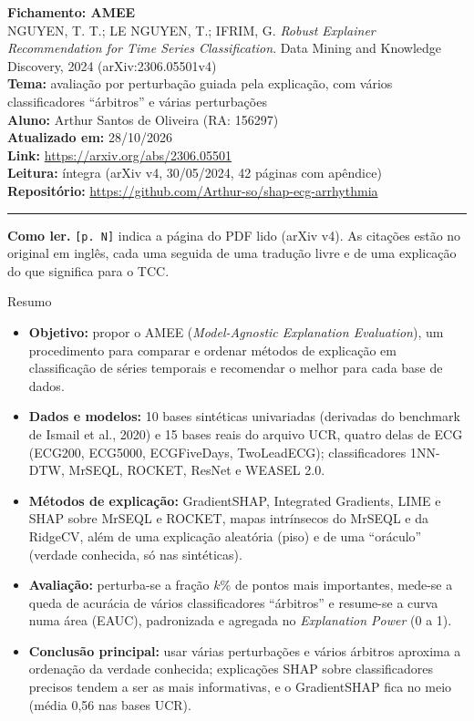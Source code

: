 \documentclass[11pt,a4paper]{article}
\begin{document}
\begin{center}
    {\LARGE \textbf{Fichamento: AMEE}} \\[0.35em]
    {\large NGUYEN, T. T.; LE NGUYEN, T.; IFRIM, G. \textit{Robust Explainer Recommendation for Time Series Classification}. Data Mining and Knowledge Discovery, 2024 (arXiv:2306.05501v4)} \\[0.3em]
    \textbf{Tema:} avaliação por perturbação guiada pela explicação, com vários classificadores ``árbitros'' e várias perturbações \\[0.2em]
    \textbf{Aluno:} Arthur Santos de Oliveira (RA: 156297) \\[0.2em]
    \textbf{Atualizado em:} 28/10/2026 \\[0.2em]
    \textbf{Link:} \url{https://arxiv.org/abs/2306.05501} \\[0.2em]
    \textbf{Leitura:} íntegra (arXiv v4, 30/05/2024, 42 páginas com apêndice) \\[0.2em]
    \textbf{Repositório:} \url{https://github.com/Arthur-so/shap-ecg-arrhythmia}
\end{center}
\vspace{-0.5em}
\hrule
\vspace{0.8em}

\textbf{Como ler.} \texttt{[p. N]} indica a página do PDF lido (arXiv v4). As citações estão no original em inglês, cada uma seguida de uma tradução livre e de uma explicação do que significa para o TCC.

\begin{infobox}[note]{Resumo}
\begin{itemize}
\item \textbf{Objetivo:} propor o AMEE (\textit{Model-Agnostic Explanation Evaluation}), um procedimento para comparar e ordenar métodos de explicação em classificação de séries temporais e recomendar o melhor para cada base de dados.
\item \textbf{Dados e modelos:} 10 bases sintéticas univariadas (derivadas do benchmark de Ismail et al., 2020) e 15 bases reais do arquivo UCR, quatro delas de ECG (ECG200, ECG5000, ECGFiveDays, TwoLeadECG); classificadores 1NN-DTW, MrSEQL, ROCKET, ResNet e WEASEL 2.0.
\item \textbf{Métodos de explicação:} GradientSHAP, Integrated Gradients, LIME e SHAP sobre MrSEQL e ROCKET, mapas intrínsecos do MrSEQL e da RidgeCV, além de uma explicação aleatória (piso) e de uma ``oráculo'' (verdade conhecida, só nas sintéticas).
\item \textbf{Avaliação:} perturba-se a fração $k$\% de pontos mais importantes, mede-se a queda de acurácia de vários classificadores ``árbitros'' e resume-se a curva numa área (EAUC), padronizada e agregada no \textit{Explanation Power} (0 a 1).
\item \textbf{Conclusão principal:} usar várias perturbações e vários árbitros aproxima a ordenação da verdade conhecida; explicações SHAP sobre classificadores precisos tendem a ser as mais informativas, e o GradientSHAP fica no meio (média 0,56 nas bases UCR).
\end{itemize}
\end{infobox}
\end{document}
